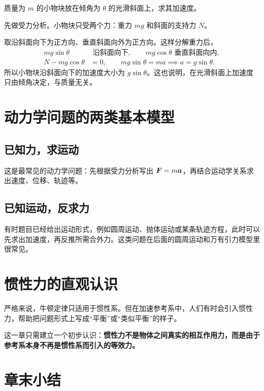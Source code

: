 \documentclass[lang=cn,11pt]{elegantbook}
\begin{document}
\begin{example}
质量为 \(m\) 的小物块放在倾角为 \(\theta\) 的光滑斜面上，求其加速度。
\end{example}

\begin{solution}
先做受力分析。小物块只受两个力：重力 \(mg\) 和斜面的支持力 \(N\)。

取沿斜面向下为正方向、垂直斜面向外为正方向。这样分解重力后，
\[
\begin{aligned}
mg\sin\theta&\text{ 沿斜面向下},\qquad
mg\cos\theta\text{ 垂直斜面向内},\\
N-mg\cos\theta&=0,\qquad
mg\sin\theta=ma
\implies a=g\sin\theta.
\end{aligned}
\]
所以小物块沿斜面向下的加速度大小为 \(g\sin\theta\)。这也说明，在光滑斜面上加速度只由倾角决定，与质量无关。
\end{solution}

\section{动力学问题的两类基本模型}

\subsection{已知力，求运动}

这是最常见的动力学问题：先根据受力分析写出 \(\vb*{F}=m\vb*{a}\)，再结合运动学关系求出速度、位移、轨迹等。

\subsection{已知运动，反求力}

有时题目已经给出运动形式，例如圆周运动、抛体运动或某条轨迹方程，此时可以先求出加速度，再反推所需合外力。这类问题在后面的圆周运动和万有引力模型里很常见。

\section{惯性力的直观认识}

严格来说，牛顿定律只适用于惯性系。但在加速参考系中，人们有时会引入惯性力，帮助把问题形式上写成“平衡”或“类似平衡”的样子。

这一章只需建立一个初步认识：\textbf{惯性力不是物体之间真实的相互作用力，而是由于参考系本身不再是惯性系而引入的等效力。}

\section{章末小结}
\end{document}
